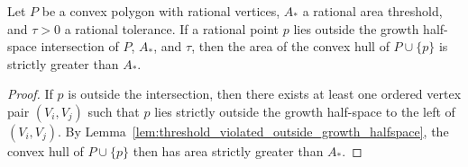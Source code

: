 \begin{lemma}
    \label{lem:threshold_violated_outside_growth_intersection}
    Let $P$ be a convex polygon with rational vertices, $A_*$ a rational
    area threshold, and $\tau > 0$ a rational tolerance. If a rational
    point $p$ lies outside the growth half-space intersection of $P$,
    $A_*$, and $\tau$, then the area of the convex hull of
    $P \cup \{p\}$ is strictly greater than $A_*$.
\end{lemma}
\begin{proof}
    If $p$ is outside the intersection, then there exists at least one
    ordered vertex pair $(V_i, V_j)$ such that $p$ lies strictly outside
    the growth half-space to the left of $(V_i, V_j)$. By
    Lemma~\ref{lem:threshold_violated_outside_growth_halfspace}, the
    convex hull of $P \cup \{p\}$ then has area strictly greater than
    $A_*$.
\end{proof}


